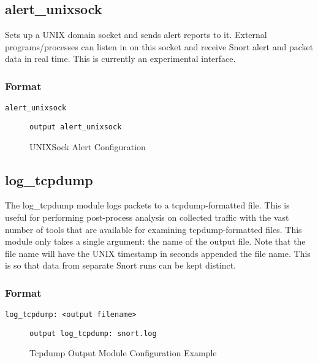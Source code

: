 \documentclass[english]{report}
\begin{document}
\subsection{alert\_unixsock}

Sets up a UNIX domain socket and sends alert reports to it. External
programs/processes can listen in on this socket and receive Snort
alert and packet data in real time. This is currently an experimental
interface.


\subsubsection{Format}

\begin{verbatim}
alert_unixsock
\end{verbatim}
%
\begin{figure}[!hbpt]
\begin{verbatim}
output alert_unixsock
\end{verbatim}

\caption{\label{unixsock configuration}UNIXSock Alert Configuration}
\end{figure}



\subsection{log\_tcpdump}

The log\_tcpdump module logs packets to a tcpdump-formatted file.
This is useful for performing post-process analysis on collected
traffic with the vast number of tools that are available for examining
tcpdump-formatted files. This module only takes a single argument: the
name of the output file. Note that the file name will have the UNIX
timestamp in seconds appended the file name. This is so that data from
separate Snort runs can be kept distinct.


\subsubsection{Format}

\begin{verbatim}
log_tcpdump: <output filename>
\end{verbatim}
%
\begin{figure}[!hbpt]
\begin{verbatim}
output log_tcpdump: snort.log
\end{verbatim}

\caption{\label{tcpdump output configuration}Tcpdump Output Module Configuration
Example}
\end{figure}
\end{document}
